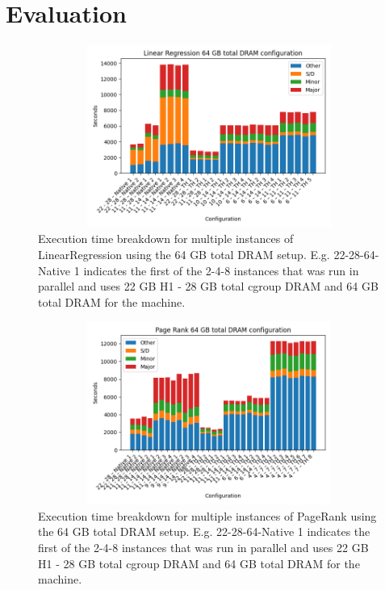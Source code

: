 \section{Evaluation}
\label{sec:eval}

\begin{figure}[ht]
	\includegraphics[width=13cm,height=6cm]{./fig/lr64.png}
    \caption{Execution time breakdown for multiple instances of
    LinearRegression using the 64 GB total DRAM setup. E.g.
    22-28-64-Native 1 indicates the first of the 2-4-8 instances that
    was run in parallel and uses 22 GB H1 - 28 GB total cgroup DRAM
    and 64 GB total DRAM for the machine.}
	\label{fig:lr64}
\end{figure}

\begin{figure}[ht]
        \includegraphics[width=13cm,height=6cm]{./fig/pr64.png}
    \caption{Execution time breakdown for multiple instances of
    PageRank using the 64 GB total DRAM setup. E.g. 22-28-64-Native 1
    indicates the first of the 2-4-8 instances that was run in
    parallel and uses 22 GB H1 - 28 GB total cgroup DRAM and 64 GB
    total DRAM for the machine.}
	\label{fig:pr64}
\end{figure}

